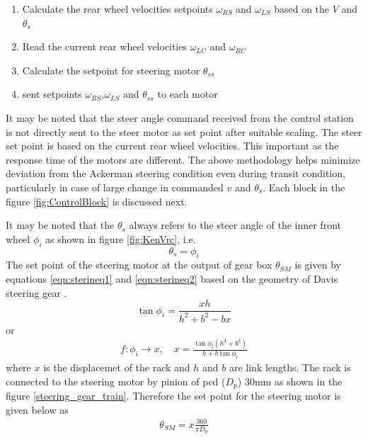 \begin{enumerate}
	\item Calculate the rear wheel velocities setpoints $\omega_{RS}$ and $\omega_{LS}$ based on the $V$ and $\theta_s$
	\item Read the current rear wheel velocities $\omega_{LC}$ and $\omega_{RC}$
	\item Calculate the setpoint for steering motor $\theta_{ss} $
	\item sent setpoints $\omega_{RS}$,$\omega_{LS}$ and $\theta_{ss} $ to each motor 
\end{enumerate}

It may be noted that the steer angle command received from the control station is not directly sent to the steer motor as set point after suitable scaling. The steer set point is based on the current rear wheel velocities. This important as the response time of the  motors are different. The above methodology helps  minimize deviation  from the Ackerman  steering condition even during transit condition, particularly in case of large change in commanded $v$ and $\theta_s$. 
Each block in the figure \ref{fig:ControlBlock} is discussed next. 

 It may be noted that the $\theta_s$ always refers to the steer angle of the inner front wheel $\phi_i$ as shown in figure \ref{fig:KenVrc}, i.e.
 \begin{equation}
	 \theta_s =\phi_i
 \end{equation}
 The set point of the steering motor at the output of  gear box $\theta_{SM}$ is given by equations \ref{eqn:sterineq1} and \ref{eqn:sterineq2}  based on the geometry of Davis steering gear \cite{TOMBook}.
\begin{equation*}
 \tan\phi_i=\frac{xh}{h^2+b^2-bx}
\end{equation*}
or
\begin{eqnarray}
f:\phi_i\rightarrow x, \quad x=\frac{\tan\phi_i (h^2+b^2)}{h+b \tan\phi_i }
\label{eqn:sterineq1}
\end{eqnarray}
where $x$ is the displacemet of the rack and $h$ and $b$ are link lengths. The rack is connected to the steering motor by pinion of pcd ($D_p$) 30mm as shown in the figure \ref{steering_gear_train}. Therefore the set point for the steering motor is given below as
\begin{eqnarray}
\theta_{SM}= x \frac{360}{\pi D_p}
\label{eqn:sterineq2}
\end{eqnarray}
 
